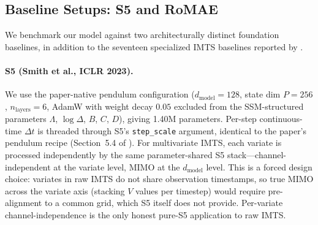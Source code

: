 %

\subsection{Baseline Setups: S5 and RoMAE}
\label{sec:baselines_setup}

We benchmark our model against two architecturally distinct foundation
baselines, in addition to the seventeen specialized IMTS baselines reported by
\citet{zhang2024irregular}.

\paragraph{S5 (Smith et al., ICLR 2023).}
We use the paper-native pendulum configuration ($d_{\text{model}}{=}128$,
state dim $P{=}256$, $n_{\text{layers}}{=}6$, AdamW with weight decay $0.05$
excluded from the SSM-structured parameters $\Lambda$, $\log\Delta$, $B$, $C$,
$D$), giving 1.40M parameters. Per-step continuous-time $\Delta t$ is threaded
through S5's \texttt{step\_scale} argument, identical to the paper's pendulum
recipe (Section~5.4 of \citet{smith2023simplified}). For multivariate IMTS,
each variate is processed independently by the same parameter-shared S5
stack---channel-independent at the variate level, MIMO at the
$d_{\text{model}}$ level. This is a forced design choice: variates in raw IMTS
do not share observation timestamps, so true MIMO across the variate axis
(stacking $V$ values per timestep) would require pre-alignment to a common
grid, which S5 itself does not provide. Per-variate channel-independence is
the only honest pure-S5 application to raw IMTS.

